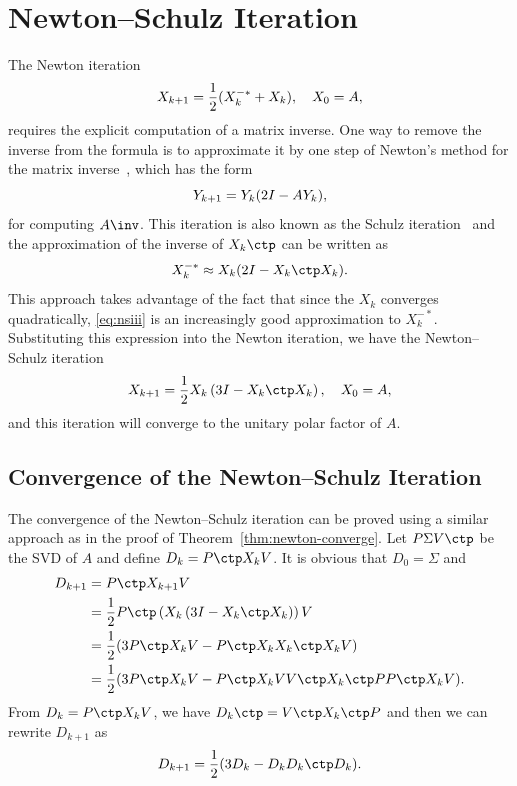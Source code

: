 \documentclass{article}
\numberwithin{equation}{section} %
\begin{document}
\section{Newton--Schulz Iteration}

The Newton iteration
\begin{equation}
  \notag
  X_{k+1} = \frac 12(X_k^{-*} + X_k),\quad X_0 = A,
\end{equation}
requires the explicit computation of a matrix inverse. One way to remove
the inverse from the formula is to approximate it by one step of Newton's
method for the matrix inverse~, which
has the form
\begin{equation}
  \notag 
  Y_{k+1} = Y_k(2I - AY_k),
\end{equation}
for computing $A\inv$. This iteration is also known as the Schulz
iteration~ and the approximation of the inverse of
$X_k\ctp$ can be written as
\begin{equation}
  \label{eq:nsiii} 
  X_k^{-*} \approx X_k(2I - X_k\ctp X_k).
\end{equation}
This approach takes advantage of the fact that since the $X_k$ converges
quadratically, \eqref{eq:nsiii} is an increasingly good approximation to
$X_k^{-*}$. Substituting this expression into the Newton iteration, we have
the Newton--Schulz iteration~
\begin{equation}
  \label{eq:ns-iteration}
  X_{k+1} = \frac 12 X_k\left(3I - X_k\ctp X_k\right), \quad X_0 = A,
\end{equation}
and this iteration will converge to the unitary polar factor of $A$.

\subsection{Convergence of the Newton--Schulz Iteration}
The convergence of the Newton--Schulz iteration can be proved using a
similar approach as in the proof of Theorem~\ref{thm:newton-converge}. Let
$P\Sigma V\ctp$ be the SVD of $A$ and define $D_k = P\ctp X_k V$. It is
obvious that $D_0 = \Sigma$ and
\begin{equation}
  \notag 
  \begin{aligned}
    D_{k+1} &= P\ctp X_{k+1} V\\
            & = \frac{1}{2}P\ctp \left(X_k\left(3I - X_k\ctp X_k\right)\right)V\\
            & = \frac{1}{2} (3P\ctp X_k V - P\ctp X_kX_k\ctp X_k V)\\
            & = \frac{1}{2} (3P\ctp X_k V - P\ctp X_k V V\ctp X_k\ctp P P\ctp X_k V).
  \end{aligned}
\end{equation}
From $D_k = P\ctp X_k V$, we have $D_k\ctp = V\ctp X_k\ctp P$ and then we
can rewrite $D_{k+1}$ as
\begin{equation}
  \label{eq:ns-iter1}
  D_{k+1} = \frac{1}{2}(3D_k-D_kD_k\ctp D_k).
\end{equation}
\end{document}
